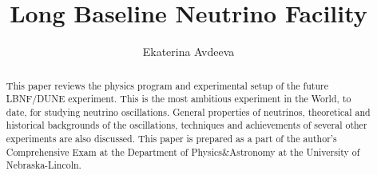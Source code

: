 \documentclass{article}
\begin{document}
 
\pagenumbering{}
\title{\textbf{Long Baseline Neutrino Facility}}

\author{Ekaterina Avdeeva}

\maketitle

\begin{abstract}
This paper reviews the physics program and experimental setup of the future LBNF/DUNE experiment. This is the most ambitious experiment in the World, to date, for studying neutrino oscillations. General properties of neutrinos, theoretical and historical backgrounds of the oscillations, techniques and achievements of several other experiments are also discussed. This paper is prepared as a part of the author's Comprehensive Exam at the Department of Physics\&Astronomy at the University of Nebraska-Lincoln.
\end{abstract}




\pagestyle{fancy}
\fancyhf{}
\lhead[]{\thepage}
\rhead[\thepage]{}

\tableofcontents

%

\clearpage

\clearpage

\clearpage

\clearpage

\clearpage

\clearpage

\clearpage
\end{document}
